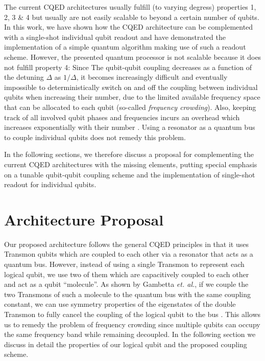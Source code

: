 The current CQED architectures usually fulfill (to varying degress) properties 1, 2, 3 \& 4 but usually are not easily scalable to beyond a certain number of qubits. In this work, we have shown how the CQED architecture can be complemented with a single-shot individual qubit readout and have demonstrated the implementation of a simple quantum algorithm making use of such a readout scheme. However, the presented quantum processor is not scalable because it does not fulfill property 4: Since The qubit-qubit coupling decreases as a function of the detuning $\Delta$ as $1/\Delta$, it becomes increasingly difficult and eventually impossible to deterministically switch on and off the coupling between individual qubits when increasing their number, due to the limited available frequency space that can be allocated to each qubit (so-called {\it frequency crowding}). Also, keeping track of all involved qubit phases and frequencies incurs an overhead which increases exponentially with their number \citep{galiautdinov_resonatorzero-qubit_2012}. Using a resonator as a quantum bus to couple individual qubits does not remedy this problem.

\smallskip

In the following sections, we therefore discuss a proposal for complementing the current CQED architectures with the missing elements, putting special emphasis on a tunable qubit-qubit coupling scheme and the implementation of single-shot readout for individual qubits.

\section{Architecture Proposal}

Our proposed architecture follows the general CQED principles in that it uses Transmon qubits which are coupled to each other via a resonator that acts as a quantum bus. However, instead of using a single Transmon to represent each logical qubit, we use two of them which are capacitively coupled to each other and act as a qubit ``molecule''. As shown by Gambetta {\it et. al.}, if we couple the two Transmons of such a molecule to the quantum bus with the same coupling constant, we can use symmetry properties of the eigenstates of the double Transmon to fully cancel the coupling of the logical qubit to the bus \citep{gambetta_superconducting_2011}. This allows us to remedy the problem of frequency crowding since multiple qubits can occupy the same frequency band while remaining decoupled. In the following section we discuss in detail the properties of our logical qubit and the proposed coupling scheme.

